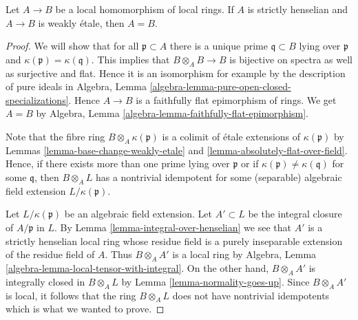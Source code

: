 \begin{theorem}[Olivier]
\label{theorem-olivier}
Let $A \to B$ be a local homomorphism of local rings.
If $A$ is strictly henselian and $A \to B$ is weakly \'etale, then
$A = B$.
\end{theorem}

\begin{proof}
We will show that for all $\mathfrak p \subset A$ there is a unique
prime $\mathfrak q \subset B$ lying over $\mathfrak p$ and
$\kappa(\mathfrak p) = \kappa(\mathfrak q)$.
This implies that $B \otimes_A B \to B$ is bijective on spectra
as well as surjective and flat. Hence it is an isomorphism
for example by the description of pure ideals in
Algebra, Lemma \ref{algebra-lemma-pure-open-closed-specializations}.
Hence $A \to B$ is a faithfully flat epimorphism of rings. We get
$A = B$ by
Algebra, Lemma \ref{algebra-lemma-faithfully-flat-epimorphism}.

\medskip\noindent
Note that the fibre ring $B \otimes_A \kappa(\mathfrak p)$
is a colimit of \'etale extensions of $\kappa(\mathfrak p)$ by
Lemmas \ref{lemma-base-change-weakly-etale} and
\ref{lemma-absolutely-flat-over-field}.
Hence, if there exists more than one prime lying over $\mathfrak p$
or if $\kappa(\mathfrak p) \not = \kappa(\mathfrak q)$ for some $\mathfrak q$,
then $B \otimes_A L$ has a nontrivial idempotent for some (separable)
algebraic field extension $L/\kappa(\mathfrak p)$.

\medskip\noindent
Let $L/\kappa(\mathfrak p)$ be an algebraic field extension.
Let $A' \subset L$ be the integral closure of $A/\mathfrak p$ in $L$.
By Lemma \ref{lemma-integral-over-henselian}
we see that $A'$ is a strictly henselian local ring
whose residue field is a purely inseparable extension of the residue
field of $A$. Thus $B \otimes_A A'$ is a local ring by
Algebra, Lemma \ref{algebra-lemma-local-tensor-with-integral}.
On the other hand, $B \otimes_A A'$ is integrally closed in
$B \otimes_A L$ by Lemma \ref{lemma-normality-goes-up}.
Since $B \otimes_A A'$ is local, it follows that the ring
$B \otimes_A L$ does not have nontrivial
idempotents which is what we wanted to prove.
\end{proof}